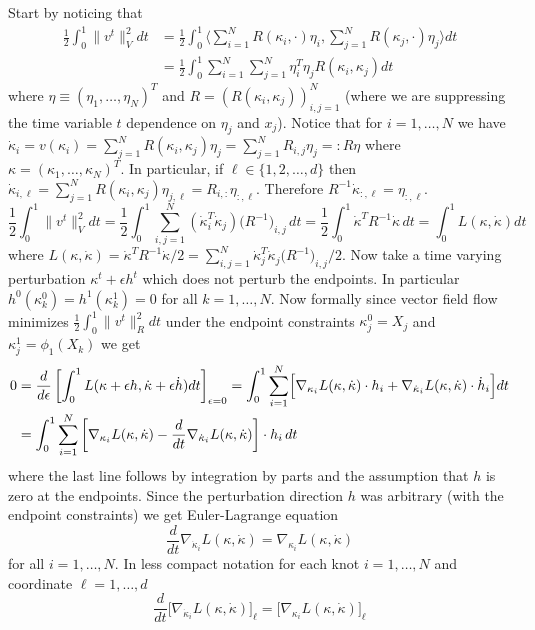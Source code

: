 \documentclass[noinfoline]{imsart}
\begin{document}
{Start by noticing that
\begin{align*}
\frac{1}{2}\int_0^1 \| v^t  \|^2_V dt &=  \frac{1}{2}\int_0^1  \langle \sum_{i=1}^N R(\kappa_i,\cdot ) \eta_i, \sum_{j=1}^N R(\kappa_j,\cdot ) \eta_j\rangle dt \\
&= \frac{1}{2}\int_0^1 \sum_{i=1}^N \sum_{j=1}^N \eta_i^T \eta_j R(\kappa_i,\kappa_j) dt
\end{align*}
where $\eta\equiv (\eta_1,\ldots,\eta_N)^T$ and $R=(R(\kappa_i,\kappa_j))_{i,j = 1}^N$ (where we are suppressing the time variable $t$ dependence on $\eta_j$ and $x_j$). Notice that for $i=1,\ldots, N$ we have $\dot \kappa_i = v(\kappa_i)= \sum_{j=1}^N R(\kappa_i,\kappa_j) \eta_j=\sum_{j=1}^N R_{i,j} \eta_j =: R\eta$ where $\kappa = (\kappa_1,\ldots, \kappa_N)^T$.
In particular, if $\ell\in \{ 1,2,\ldots, d \}$ then $\dot \kappa_{i,\ell} =\sum_{j=1}^N R(\kappa_i,\kappa_j) \eta_{j,\ell} =  R_{i,:} \eta_{:,\ell}$. Therefore $ R^{-1} \dot \kappa_{:,\ell} =\eta_{:,\ell}$.
\[ \frac{1}{2}\int_0^1 \| v^t  \|^2_V dt =  \frac{1}{2}\int_0^1 \sum_{i,j=1}^N (\dot\kappa_i^T\dot\kappa_j) \bigl(R^{-1}\bigr)_{i,j} \, dt  =  \frac{1}{2}\int_0^1 \dot\kappa^T R^{-1} \dot\kappa \, dt  = \int_0^1 L(\kappa,\dot\kappa) dt   \]
where $L(\kappa,\dot\kappa) =\dot\kappa^T R^{-1} \dot\kappa/2= \sum_{i,j=1}^N \dot\kappa_j^T\dot\kappa_j \bigl(R^{-1}\bigr)_{i,j} /2$.
 Now take a time varying perturbation $\kappa^t +\epsilon h^t$ which does not perturb the endpoints. In particular $h^0(\kappa^0_k)=h^1(\kappa^1_k)=0$ for all $k=1,\ldots, N$. Now formally since vector field flow minimizes $\frac{1}{2}\int_0^1 \| v^t  \|^2_R dt$ under the endpoint constraints $\kappa_j^{0}=X_j$ and $\kappa_j^{1}=\phi_1(X_k)$ we get
\begin{align*}
0&=\frac{d}{d\epsilon} \left[\int_0^1 L(\kappa+\epsilon h,\dot \kappa+\epsilon \dot h)dt\right]_{\epsilon = 0}
=\int_0^1\sum_{i=1}^N \Bigl[ \nabla_{\kappa_i}L(\kappa,\dot \kappa)\cdot h_i + \nabla_{\dot\kappa_i}L(\kappa,\dot \kappa)\cdot \dot h_i\Bigr]  dt  \\
&=\int_0^1\sum_{i=1}^N  \left[ \nabla_{\kappa_i} L(\kappa,\dot \kappa) - \frac{d}{dt} \nabla_{\dot\kappa_i}L (\kappa,\dot \kappa)\right] \cdot h_i  \, dt
\end{align*}
where the last line follows by integration by parts and the assumption that $h$ is zero at the endpoints. Since the perturbation direction $h$ was arbitrary (with the endpoint constraints) we get Euler-Lagrange equation
\begin{equation}
\label{EL}
 \frac{d}{dt}\nabla_{\dot\kappa_i} L(\kappa,\dot \kappa) =  \nabla_{\kappa_i} L(\kappa,\dot \kappa)
\end{equation}
for all $i=1,\ldots, N$.
In less compact notation for each knot $i=1,\ldots, N$ and coordinate $\ell = 1,\ldots, d$
\begin{equation}
\label{EL}
 \frac{d}{dt}\bigl[\nabla_{\dot\kappa_i} L(\kappa,\dot \kappa)\bigr]_\ell = \bigl[ \nabla_{\kappa_i} L(\kappa,\dot \kappa)\bigr]_{\ell}
\end{equation}

}
\end{document}
